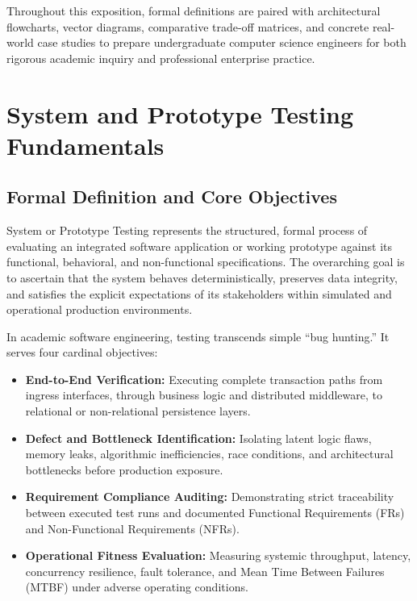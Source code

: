\documentclass[11pt,a4paper]{article}
\begin{document}
Throughout this exposition, formal definitions are paired with architectural flowcharts, vector diagrams, comparative trade-off matrices, and concrete real-world case studies to prepare undergraduate computer science engineers for both rigorous academic inquiry and professional enterprise practice.

\section{System and Prototype Testing Fundamentals}
\label{sec:testing_fundamentals}

\subsection{Formal Definition and Core Objectives}
System or Prototype Testing represents the structured, formal process of evaluating an integrated software application or working prototype against its functional, behavioral, and non-functional specifications. The overarching goal is to ascertain that the system behaves deterministically, preserves data integrity, and satisfies the explicit expectations of its stakeholders within simulated and operational production environments.

In academic software engineering, testing transcends simple ``bug hunting.'' It serves four cardinal objectives:
\begin{itemize}
    \item \textbf{End-to-End Verification:} Executing complete transaction paths from ingress interfaces, through business logic and distributed middleware, to relational or non-relational persistence layers.
    \item \textbf{Defect and Bottleneck Identification:} Isolating latent logic flaws, memory leaks, algorithmic inefficiencies, race conditions, and architectural bottlenecks before production exposure.
    \item \textbf{Requirement Compliance Auditing:} Demonstrating strict traceability between executed test runs and documented Functional Requirements (FRs) and Non-Functional Requirements (NFRs).
    \item \textbf{Operational Fitness Evaluation:} Measuring systemic throughput, latency, concurrency resilience, fault tolerance, and Mean Time Between Failures (MTBF) under adverse operating conditions.
\end{itemize}
\end{document}
